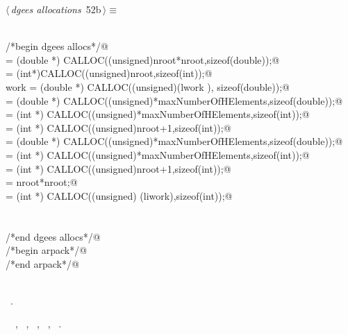\documentclass{article}
\begin{document}
\begin{flushleft} \small
\begin{minipage}{\linewidth}\label{scrap75}\raggedright\small
{} $\langle\,${\itshape dgees allocations}\nobreak\ {\footnotesize {52b}}$\,\rangle\equiv$
\vspace{-1ex}
\begin{list}{}{} \item
\mbox{}\verb@@\\
\mbox{}\verb@/*begin dgees allocs*/@\\
\mbox{}\verb@beyondQmat = (double *) CALLOC((unsigned)nroot*nroot,sizeof(double));@\\
\mbox{}\verb@bwork = (int*)CALLOC((unsigned)nroot,sizeof(int));@\\
\mbox{}\verb@   work = (double *) CALLOC((unsigned)(lwork ), sizeof(double));@\\
\mbox{}\verb@a = (double *) CALLOC((unsigned)*maxNumberOfHElements,sizeof(double));@\\
\mbox{}\verb@ja = (int *) CALLOC((unsigned)*maxNumberOfHElements,sizeof(int));@\\
\mbox{}\verb@ia = (int *) CALLOC((unsigned)nroot+1,sizeof(int));@\\
\mbox{}\verb@ta = (double *) CALLOC((unsigned)*maxNumberOfHElements,sizeof(double));@\\
\mbox{}\verb@tja = (int *) CALLOC((unsigned)*maxNumberOfHElements,sizeof(int));@\\
\mbox{}\verb@tia = (int *) CALLOC((unsigned)nroot+1,sizeof(int));@\\
\mbox{}\verb@liwork = nroot*nroot;@\\
\mbox{}\verb@anotheriwork = (int *) CALLOC((unsigned) (liwork),sizeof(int));@\\
\mbox{}\verb@@\\
\mbox{}\verb@@\\
\mbox{}\verb@/*end dgees allocs*/@\\
\mbox{}\verb@/*begin arpack*/@\\
\mbox{}\verb@/*end arpack*/@\\
\mbox{}\verb@@\\
\mbox{}\verb@@{\NWsep}
\end{list}
\vspace{-1.5ex}
\footnotesize
\begin{list}{}{\setlength{\itemsep}{-\parsep}\setlength{\itemindent}{-\leftmargin}}
\item \NWtxtMacroRefIn\ .
\item \NWtxtIdentsUsed\nobreak\  \verb@ia@\nobreak\ , \verb@lwork@\nobreak\ , \verb@maxNumberOfHElements@\nobreak\ , \verb@nroot@\nobreak\ , \verb@work@\nobreak\ .
\item{}
\end{list}
\end{minipage}\vspace{4ex}
\end{flushleft}
\end{document}
